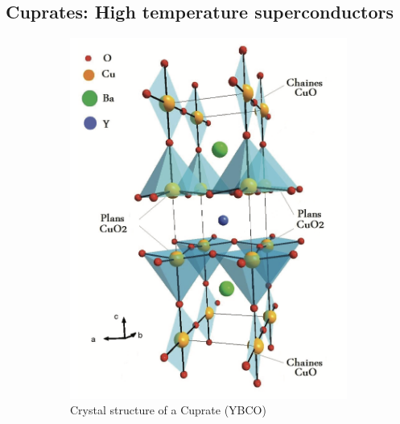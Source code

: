 \subsection{Cuprates: High temperature superconductors}
\begin{figure}
    \centering
    \begin{subfigure}{0.37\textwidth}
        \centering
        \includegraphics[width=\textwidth]{figures/cuprate_structure}
        \caption{Crystal structure of a Cuprate (YBCO)}
        \label{fig:cuprate_structure}
    \end{subfigure}\hfill
    \begin{subfigure}{0.5\textwidth}
        \centering

\end{subfigure}
\end{figure}
